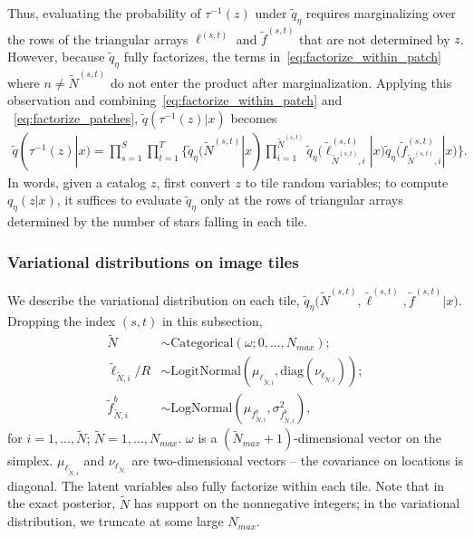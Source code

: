 Thus, evaluating the probability of $\tau^{-1}(z)$ under $\tilde q_\eta$ requires marginalizing over the rows of the triangular arrays $\ell^{(s, t)}$ and $\tilde f^{(s, t)}$ that are not determined by $z$. However, 
because $\tilde q_\eta$ fully factorizes, the terms 
in~\eqref{eq:factorize_within_patch} where $n \not= \tilde N^{(s,t)}$ do not enter the
product
after marginalization.
Applying this observation and combining~\eqref{eq:factorize_within_patch} and ~\eqref{eq:factorize_patches}, $\tilde q(\tau^{-1}(z) | x)$ becomes
\begin{align}
    \tilde q(\tau^{-1}(z) | x) = \prod_{s=1}^S\prod_{t=1}^T
    \Big\{
    \tilde q_\eta(\tilde N^{(s,t)} | x) 
    \prod_{i = 1}^{\tilde N^{(s,t)}}
    \tilde q_\eta\big(\tilde \ell_{\tilde N^{(s,t)},i}^{(s, t)} | x\big)
    \tilde q_\eta\big(\tilde f_{\tilde N^{(s,t)},i}^{(s, t)} | x\big)
    \Big\}.
\end{align}
In words, given a catalog $z$,
first convert $z$ to tile random variables;
to compute $q_\eta(z | x)$, it suffices to evaluate $\tilde q_\eta$ only at the rows of triangular 
arrays determined by the number 
of stars falling in each tile. 



\subsubsection{Variational distributions on image tiles}
We describe the variational distribution on each tile,
$\tilde q_\eta\big(\tilde N^{(s, t)}, \tilde \ell^{(s, t)}, \tilde f^{(s, t)} | x\big)$. Dropping the index 
$(s,t)$ in this subsection, 
\begin{align}
    \tilde N &\sim \text{Categorical}(
    \omega; 0, ..., N_{max});  \label{eq:var_distr_n}\\
	\tilde \ell_{\tilde N, i} / R &\sim \text{LogitNormal}(\mu_{\ell_{\tilde N, i}}, \text{diag}(\nu_{\ell_{\tilde N, i}}) )\label{eq:var_distr_loc}; \\
	\tilde f^b_{\tilde N, i} &\sim \text{LogNormal}(\mu_{f^b_{\tilde N, i}}, \sigma^2_{f^b_{\tilde N, i}}), \label{eq:var_distr_f}
\end{align}
for $i = 1, ..., \tilde N$; $\tilde{N} = 1, ..., N_{max}$. 
$\omega$ is a $(\tilde N_{max} + 1)$-dimensional vector on the simplex. $\mu_{\ell_{\tilde N, i}}$ and $\nu_{\ell_{\tilde N, }}$ are two-dimensional vectors -- the covariance on locations is diagonal. 
The latent variables also fully factorize within each tile. Note that in the exact posterior, $\tilde N$ has support on the nonnegative integers; in the variational distribution, we truncate at some large $N_{max}$. 


